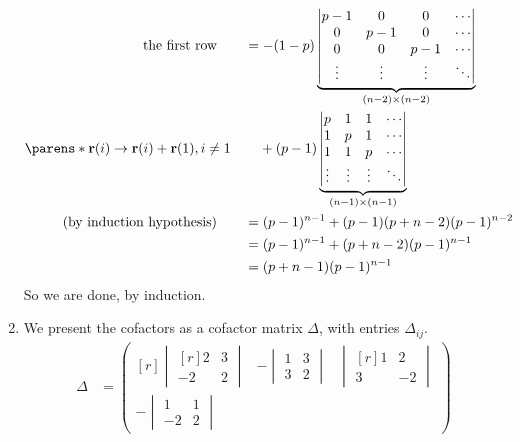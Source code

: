 \documentclass[fleqn,a4paper,11pt]{article}
\begin{document}
\begin{enumerate}[label=\textbf{\arabic*.}]
\begin{alignat*}
{\begin{gathered}
      \text{the first row}
     \end{gathered}} \quad
    && &= -(1 - p)\underbrace{\begin{vmatrix}
     p - 1 & 0 & 0 & \cdots \\
     0 & p - 1 & 0 & \cdots \\
     0 & 0 & p - 1 & \cdots \\
     \vdots & \vdots & \vdots & \ddots \\
    \end{vmatrix}}_{(n - 2) \times (n - 2)} \\
    \parens*{
     \vec r(i) \to \vec r(i) + \vec r(1), i \ne 1
    }
    && &\phantom{={}} + (p - 1)\underbrace{\begin{vmatrix}
     p & 1 & 1 & \cdots \\
     1 & p & 1 & \cdots \\
     1 & 1 & p & \cdots \\
     \vdots & \vdots & \vdots & \ddots
    \end{vmatrix}}_{(n - 1) \times (n - 1)} \\
    (\text{by induction hypothesis})\quad
    && &= (p - 1)^{n - 1} + (p - 1) (p + n - 2)(p - 1)^{n - 2} \\
    && &= (p - 1)^{n - 1} + (p + n - 2)(p - 1)^{n - 1} \\
    && &= (p + n - 1)(p - 1)^{n - 1}
   \end{alignat*}
   So we are done, by induction.
  \item
   We present the cofactors as a cofactor matrix \(\Delta\), with entries
   \(\Delta_{ij}\).
   \begin{align*}
    \Delta
    &= \begin{pmatrix*}[r]
     \begin{vmatrix*}[r]
      2 & 3 \\
      -2 & 2
     \end{vmatrix*} &
     -\begin{vmatrix}
      1 & 3 \\
      3 & 2
     \end{vmatrix} &
     \begin{vmatrix*}[r]
      1 & 2 \\
      3 & -2
     \end{vmatrix*} \\[3ex]
     -\begin{vmatrix}
      1 & 1 \\
      -2 & 2
     \end{vmatrix} &

\end{pmatrix*}
\end{align*}
\end{enumerate}
\end{document}

